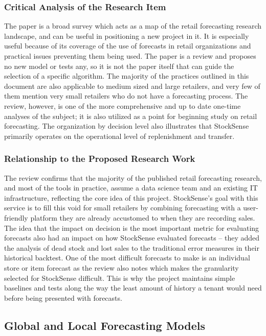 \documentclass{StockSense}
\begin{document}
\subsubsection{Critical Analysis of the Research Item}

The paper is a broad survey which acts as a map of the retail forecasting research landscape, and can be useful in positioning a new project in it. It is especially useful because of its coverage of the use of forecasts in retail organizations and practical issues preventing them being used. The paper is a review and proposes no new model or tests any, so it is not the paper itself that can guide the selection of a specific algorithm. The majority of the practices outlined in this document are also applicable to medium sized and large retailers, and very few of them mention very small retailers who do not have a forecasting process. The review, however, is one of the more comprehensive and up to date one-time analyses of the subject; it is also utilized as a point for beginning study on retail forecasting. The organization by decision level also illustrates that StockSense primarily operates on the operational level of replenishment and transfer.

\subsubsection{Relationship to the Proposed Research Work}

The review confirms that the majority of the published retail forecasting research, and most of the tools in practice, assume a data science team and an existing IT infrastructure, reflecting the core idea of this project. StockSense's goal with this service is to fill this void for small retailers by combining forecasting with a user-friendly platform they are already accustomed to when they are recording sales. The idea that the impact on decision is the most important metric for evaluating forecasts also had an impact on how StockSense evaluated forecasts – they added the analysis of dead stock and lost sales to the traditional error measures in their historical backtest. One of the most difficult forecasts to make is an individual store or item forecast as the review also notes which makes the granularity selected for StockSense difficult. This is why the project maintains simple baselines and tests along the way the least amount of history a tenant would need before being presented with forecasts.

\subsection{Global and Local Forecasting Models}
\end{document}
